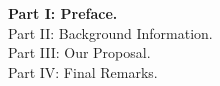 \begin{description}
    \item[\textbf{Part I: Preface.}] 
    
    \item[Part II: Background Information.] 
    
    \item[Part III: Our Proposal.]
    
    \item[Part IV: Final Remarks.]
\end{description}